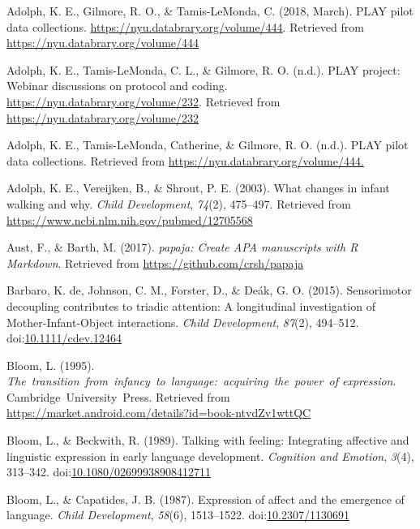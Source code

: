 \documentclass[english,man]{apa6}
\theoremstyle{definition}
\theoremstyle{definition}
\theoremstyle{definition}
\theoremstyle{remark}
\begin{document}
\hypertarget{ref-PLAY-pilot-volume}{}
Adolph, K. E., Gilmore, R. O., \& Tamis-LeMonda, C. (2018, March). PLAY
pilot data collections. \url{https://nyu.databrary.org/volume/444}.
Retrieved from \url{https://nyu.databrary.org/volume/444}

\hypertarget{ref-PLAY-webinar-Databrary}{}
Adolph, K. E., Tamis-LeMonda, C. L., \& Gilmore, R. O. (n.d.). PLAY
project: Webinar discussions on protocol and coding.
\url{https://nyu.databrary.org/volume/232}. Retrieved from
\url{https://nyu.databrary.org/volume/232}

\hypertarget{ref-play-pilot-volume}{}
Adolph, K. E., Tamis-LeMonda, Catherine, \& Gilmore, R. O. (n.d.). PLAY
pilot data collections. Retrieved from
\url{https://nyu.databrary.org/volume/444.}

\hypertarget{ref-Adolph2003-rw}{}
Adolph, K. E., Vereijken, B., \& Shrout, P. E. (2003). What changes in
infant walking and why. \emph{Child Development}, \emph{74}(2),
475--497. Retrieved from
\url{https://www.ncbi.nlm.nih.gov/pubmed/12705568}

\hypertarget{ref-R-papaja}{}
Aust, F., \& Barth, M. (2017). \emph{papaja: Create APA manuscripts with
R Markdown}. Retrieved from \url{https://github.com/crsh/papaja}

\hypertarget{ref-De_Barbaro2015-bp}{}
Barbaro, K. de, Johnson, C. M., Forster, D., \& Deák, G. O. (2015).
Sensorimotor decoupling contributes to triadic attention: A longitudinal
investigation of Mother-Infant-Object interactions. \emph{Child
Development}, \emph{87}(2), 494--512.
doi:\href{https://doi.org/10.1111/cdev.12464}{10.1111/cdev.12464}

\hypertarget{ref-Bloom1995-xb}{}
Bloom, L. (1995).
\emph{The~transition~from~infancy~to~language:~acquiring~the~power~of
expression}. Cambridge~University~Press. Retrieved from
\url{https://market.android.com/details?id=book-ntvdZv1wttQC}

\hypertarget{ref-Bloom1989-mw}{}
Bloom, L., \& Beckwith, R. (1989). Talking with feeling: Integrating
affective and linguistic expression in early language development.
\emph{Cognition and Emotion}, \emph{3}(4), 313--342.
doi:\href{https://doi.org/10.1080/02699938908412711}{10.1080/02699938908412711}

\hypertarget{ref-Bloom1987-md}{}
Bloom, L., \& Capatides, J. B. (1987). Expression of affect and the
emergence of language. \emph{Child Development}, \emph{58}(6),
1513--1522. doi:\href{https://doi.org/10.2307/1130691}{10.2307/1130691}
\end{document}
